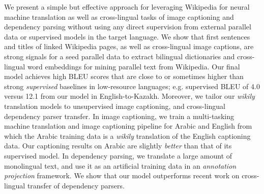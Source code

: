 We present a simple but effective approach for leveraging Wikipedia for neural machine translation as well as cross-lingual tasks of image captioning and dependency parsing without using any direct supervision from external parallel data or supervised models in the target language. We show that first sentences and titles of linked Wikipedia pages, as well as cross-lingual image captions, are strong signals for a seed parallel data to extract bilingual dictionaries and cross-lingual word embeddings for mining parallel text from Wikipedia. Our final model achieves high BLEU scores that are close to or sometimes higher than strong \emph{supervised} baselines in low-resource languages; e.g. supervised BLEU of 4.0 versus 12.1 from our model in English-to-Kazakh.  Moreover, we tailor our \emph{wikily} translation models to unsupervised image captioning, and cross-lingual dependency parser transfer. In image captioning, we train a multi-tasking machine translation and image captioning pipeline for Arabic and English from which the Arabic training data is a \emph{wikily} translation of the English captioning data. Our captioning results on Arabic are slightly \emph{better} than that of its supervised model. In dependency parsing, we translate a large amount of monolingual text, and use it as an artificial training data in an \emph{annotation projection} framework. We show that our model outperforms recent work on cross-lingual transfer of dependency parsers.
